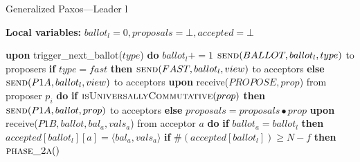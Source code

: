 \documentclass[algorithms,article,accept,moreauthors,pdftex,10pt,a4paper]{Definitions/mdpi}
\begin{document}
\begin{algorithm}[H] 
\caption{Generalized Paxos---Leader l}
\label{CFT-Lead}
\textbf{Local variables:} $ballot_l = 0,proposals = \bot, accepted = \bot$
\begin{algorithmic}[1]
\State \textbf{upon} trigger\_next\_ballot($type$) \textbf{do}
\State \hspace{\algorithmicindent} $ballot_l \mathrel{+{=}} 1$
\State \hspace{\algorithmicindent} $\Call{send}{BALLOT,ballot_l,type}$ to proposers
\State
\State \hspace{\algorithmicindent} \textbf{if} $type = fast$ \textbf{then}
\State \hspace{\algorithmicindent}\hspace{\algorithmicindent} $\Call{send}{FAST,ballot_l,view} $ to acceptors
\State \hspace{\algorithmicindent} \textbf{else}
\State \hspace{\algorithmicindent}\hspace{\algorithmicindent} $\Call{send}{P1A, ballot_l, view}$ to acceptors
\State
\State \textbf{upon} receive($PROPOSE, prop$) from proposer $p_i$ \textbf{do} 
\State \hspace{\algorithmicindent} \textbf{if} $\Call{isUniversallyCommutative}{prop}$ \textbf{then}
\State \hspace{\algorithmicindent}\hspace{\algorithmicindent} $\Call{send}{P1A, ballot, prop}$ to acceptors
\State \hspace{\algorithmicindent} \textbf{else}
\State \hspace{\algorithmicindent}\hspace{\algorithmicindent} $proposals = proposals \bullet prop$
\State
\State \textbf{upon} receive($P1B, ballot, bal_a,vals_a$) from acceptor $a$ \textbf{do}
\State \hspace{\algorithmicindent} \textbf{if} $ballot_a = ballot_l$ \textbf{then}
\State \hspace{\algorithmicindent}\hspace{\algorithmicindent} $accepted[ballot_l][a] =\langle bal_a, vals_a \rangle$
\State \hspace{\algorithmicindent}\hspace{\algorithmicindent} \textbf{if} $\#(accepted[ballot_l]) \geq N-f$ \textbf{then} 
\State \hspace{\algorithmicindent}\hspace{\algorithmicindent}\hspace{\algorithmicindent} $\Call{phase\_2a}{ }$

\end{algorithmic}
\end{algorithm}
\end{document}
